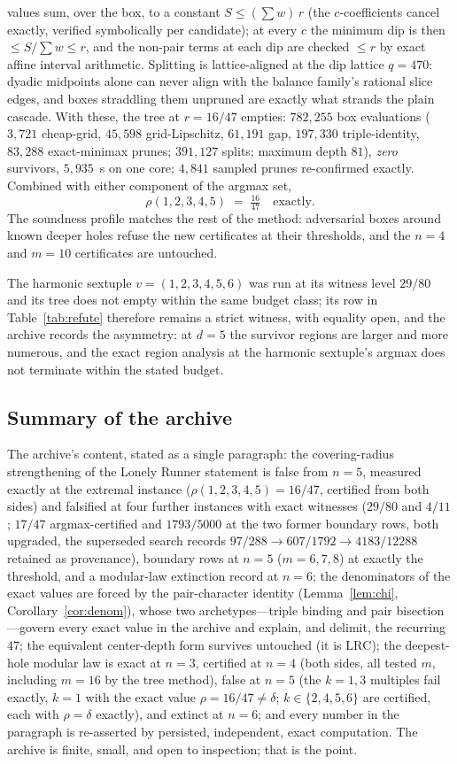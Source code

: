 \documentclass[11pt,a4paper]{article}
\numberwithin{equation}{section}
\theoremstyle{plain}
\theoremstyle{definition}
\theoremstyle{remark}
\newcommand{\lrc}{\mathrm{LRC}}
\begin{document}
values sum, over the box, to a constant $S\le(\sum w)\,r$ (the
$c$-coefficients cancel exactly, verified symbolically per candidate);
at every $c$ the minimum dip is then $\le S/\sum w\le r$, and the
non-pair terms at each dip are checked $\le r$ by exact affine interval
arithmetic. Splitting is lattice-aligned at the dip lattice $q=470$:
dyadic midpoints alone can never align with the balance family's
rational slice edges, and boxes straddling them unpruned are exactly
what strands the plain cascade. With these, the tree at $r=16/47$
empties: $782{,}255$ box evaluations ($3{,}721$ cheap-grid,
$45{,}598$ grid-Lipschitz, $61{,}191$ gap, $197{,}330$ triple-identity,
$83{,}288$ exact-minimax prunes; $391{,}127$ splits; maximum depth
$81$), \emph{zero} survivors, $5{,}935$~s on one core; $4{,}841$
sampled prunes re-confirmed exactly. Combined with either component of
the argmax set,
\[
\rho(1,2,3,4,5)\;=\;\tfrac{16}{47}\quad\text{exactly.}
\]
The soundness profile matches the rest of the method: adversarial boxes
around known deeper holes refuse the new certificates at their
thresholds, and the $n=4$ and $m=10$ certificates are untouched.

The harmonic sextuple $v=(1,2,3,4,5,6)$ was run at its witness level
$29/80$ and its tree does not empty within the same budget class; its
row in Table~\ref{tab:refute} therefore remains a strict witness, with
equality open, and the archive records the asymmetry: at
$d=5$ the survivor regions are larger and more numerous, and the exact
region analysis at the harmonic sextuple's argmax does not terminate
within the stated budget.

\subsection{Summary of the archive}

The archive's content, stated as a single paragraph: the
covering-radius strengthening of the Lonely Runner statement is false
from $n=5$, measured exactly at the extremal instance
($\rho(1,2,3,4,5)=16/47$, certified from both sides) and falsified at
four further instances with exact witnesses ($29/80$ and $4/11$;
$17/47$ argmax-certified and $1793/5000$ at the two former boundary
rows, both upgraded, the superseded search records
$97/288\to607/1792\to4183/12288$ retained as provenance), boundary
rows at $n=5$ ($m=6,7,8$) at exactly the threshold, and a modular-law
extinction record at $n=6$; the denominators of the exact values are
forced by the pair-character identity (Lemma~\ref{lem:chi},
Corollary~\ref{cor:denom}), whose two archetypes---triple binding and
pair bisection---govern every exact value in the archive and explain,
and delimit, the recurring $47$; the equivalent
center-depth form survives untouched (it is $\lrc$); the deepest-hole
modular law is exact at $n=3$, certified at $n=4$ (both sides, all
tested $m$, including $m=16$ by the tree method), false at $n=5$ (the
$k=1,3$ multiples fail exactly, $k=1$ with the exact value
$\rho=16/47\ne\delta$; $k\in\{2,4,5,6\}$ are certified, each with
$\rho=\delta$ exactly), and extinct at $n=6$; and every number in the
paragraph is re-asserted by persisted, independent, exact computation.
The archive is finite, small, and open to inspection; that is the
point.
\end{document}
